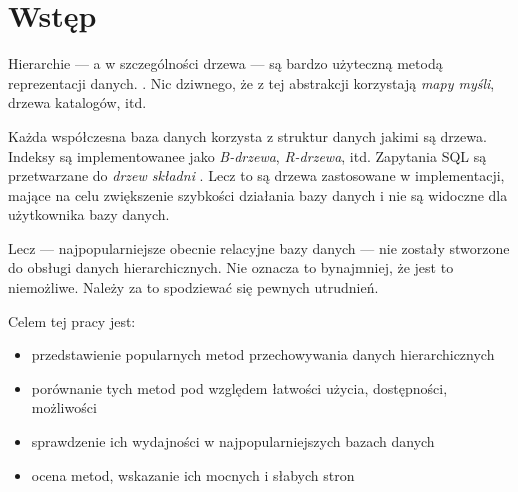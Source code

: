 \chapter*{Wstęp}






Hierarchie --- a w szczególności drzewa --- są bardzo użyteczną metodą reprezentacji danych. . 
Nic dziwnego, że z tej abstrakcji korzystają \emph{mapy myśli}, drzewa katalogów, itd.






Każda współczesna baza danych korzysta z struktur danych jakimi są drzewa. 
Indeksy są implementowanee jako \emph{B-drzewa}, \emph{R-drzewa}, itd.
Zapytania SQL są przetwarzane do \emph{drzew składni} .
Lecz to są drzewa zastosowane w implementacji, mające na celu zwiększenie szybkości działania bazy danych i nie są widoczne dla użytkownika bazy danych.

Lecz --- najpopularniejsze obecnie relacyjne bazy danych --- nie zostały stworzone do obsługi danych hierarchicznych.
Nie oznacza to bynajmniej, że jest to niemożliwe.
Należy za to spodziewać się pewnych utrudnień.





Celem tej pracy jest:
\begin{itemize}
    \item przedstawienie popularnych metod przechowywania danych hierarchicznych
    \item porównanie tych metod pod względem łatwości użycia, dostępności, możliwości
    \item sprawdzenie ich wydajności w najpopularniejszych bazach danych
    \item ocena metod, wskazanie ich mocnych i słabych stron
\end{itemize}

